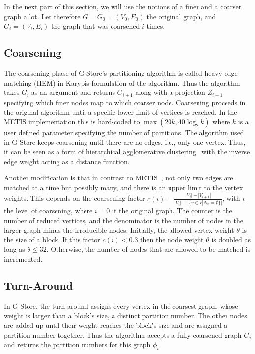     
    In the next part of this section, we will use the notions of a finer and a coarser graph a lot. Let therefore $G = G_0 = (V_0, E_0)$ the original graph, and $G_i = (V_i, E_i)$ the graph that was coarsened $i$ times.
    
    \subsection*{Coarsening}
    The coarsening phase of G-Store's partitioning algorithm is called heavy edge matching (HEM) in Karypis formulation of the algorithm. 
    Thus the algorithm takes $G_i$ as an argument and returns $G_{i+1}$ along with a projection $Z_{i+1}$ specifying which finer nodes map to which coarser node.
    Coarsening proceeds in the original algorithm until a specific lower limit of vertices is reached.
    In the METIS implementation this is hard-coded to  $\max \left( 20k, 40 \log_2 k\right)$ where $k$ is a user defined parameter specifying the number of partitions.
    The algorithm used in G-Store keeps coarsening until there are no edges, i.e., only one vertex.
    Thus, it can be seen as a form of hierarchical agglomerative clustering~\autocite{hac} with the inverse edge weight acting as a distance function.
    
    Another modification is that in contrast to METIS~\autocite{karypis}, not only two edges are matched at a time but possibly many, and there is an upper limit to the vertex weights. 
    This depends on the coarsening factor $c(i) = \frac{|V_i| - |V_{i+1}|}{|V_i| - |\{v \in V | N_v = \emptyset \}|}$, with $i$ the level of coarsening, where $i=0$ it the original graph.
    The counter is the number of reduced vertices, and the denominator is the number of nodes in the larger graph minus the irreducible nodes.
    Initially, the allowed vertex weight $\theta$ is the size of a block.
    If this factor $c(i) < 0.3$ then the node weight $\theta$ is doubled as long as $\theta \leq 32$.
    Otherwise, the number of nodes that are allowed to be matched is incremented.
        
    \subsection*{Turn-Around}
    In G-Store, the turn-around assigns every vertex in the coarsest graph, whose weight is larger than a block's size, a distinct partition number.
    The other nodes are added up until their weight reaches the block's size and are assigned a partition number together.
    Thus the algorithm accepts a fully coarsened graph $G_i$ and returns the partition numbers for this graph $\phi_i$.
    
